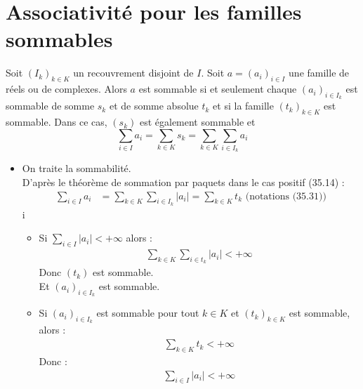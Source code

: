 \documentclass[../main.tex]{subfiles}
\begin{document}
\section{Associativité pour les familles sommables}
\begin{tcolorbox}[title=Théorème 35.31, title filled=false, colframe=orange, colback=orange!10!white]
    Soit $\left(I_k\right)_{k \in K}$ un recouvrement disjoint de $I$. Soit $a=\left(a_i\right)_{i \in I}$ une famille de réels ou de complexes. Alors $a$ est sommable si et seulement chaque $\left(a_i\right)_{i \in I_k}$ est sommable de somme $s_k$ et de somme absolue $t_k$ et si la famille $\left(t_k\right)_{k \in K}$ est sommable. Dans ce cas, $\left(s_k\right)$ est également sommable et
    $$\sum_{i \in I} a_i=\sum_{k \in K} s_k=\sum_{k \in K} \sum_{i \in I_k} a_i$$
\end{tcolorbox}

\begin{itemize}
    \item On traite la sommabilité. \\
    D'après le théorème de sommation par paquets dans le cas positif (35.14) : 
    \begin{align*}
        \sum_{i\in I} a_i &= \sum_{k\in K} \sum_{i\in I_k} |a_i| = \sum_{k\in K} t_k \text{ (notations (35.31))}
    \end{align*}i
    \begin{itemize}
        \item Si $\sum_{i\in I} |a_i| < +\infty$ alors : 
        \begin{align*}
            \sum_{k\in K}\sum_{i\in t_k} |a_i| < +\infty
        \end{align*}
        Donc $(t_k)$ est sommable. \\
        Et $(a_i)_{i\in I_k}$ est sommable. 
        \item Si $(a_i)_{i\in I_k}$ est sommable pour tout $k\in K$ et $(t_k)_{k\in K}$ est sommable, alors :
        \begin{align*}
            \sum_{k\in K} t_k < +\infty
        \end{align*}
        Donc : 
        \begin{align*}
            \sum_{i\in I} |a_i| < +\infty
        \end{align*}
    \end{itemize}
\end{itemize}

\end{document}
